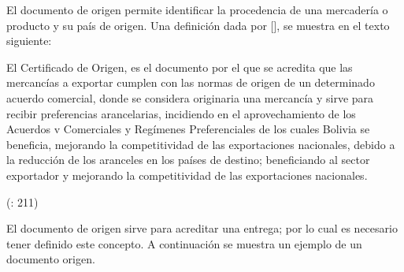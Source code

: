 El documento de origen permite identificar la procedencia de una mercadería o producto y su país de origen. Una definición dada por [\citep{PFECO:2020:Online}], se muestra en el texto siguiente:

\begin{center}
    \begin{minipage}{0.9\linewidth}
        \vspace{5pt}
        {\small
		El Certificado de Origen, es el documento por el que se acredita que las mercancías a exportar cumplen con las normas de origen de un determinado acuerdo comercial, donde se considera originaria una mercancía y sirve para recibir preferencias arancelarias, incidiendo en el aprovechamiento de los Acuerdos v Comerciales y Regímenes Preferenciales de los cuales Bolivia se beneficia, mejorando la competitividad de las exportaciones nacionales, debido a la reducción de los aranceles en los países de destino; beneficiando al sector exportador y mejorando la competitividad de las exportaciones nacionales.
		}
        \begin{flushright}
            (\citeauthor{PrinStraMark}: 211)
        \end{flushright}
        \vspace{5pt}
    \end{minipage}
\end{center}

El documento de origen sirve para acreditar una entrega; por lo cual es necesario tener definido este concepto. A continuación se muestra un ejemplo de un documento origen.

